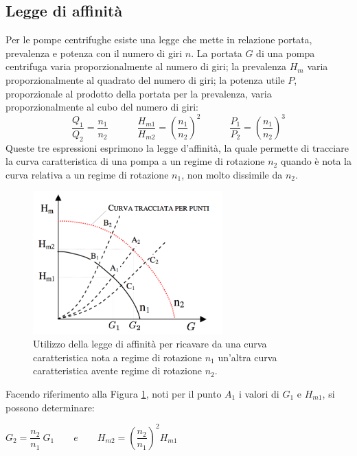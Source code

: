 \documentclass[laurea,oneside,11pt]{USiena_tesiLM}
\begin{document}
\subsection{Legge di affinità}
Per le pompe centrifughe esiste una legge che mette in relazione portata, prevalenza e potenza con il numero di giri $n$.
La portata $G$ di una pompa centrifuga varia proporzionalmente al numero di giri; la prevalenza $H_m$ varia proporzionalmente al quadrato del numero di giri; la potenza utile $P$, proporzionale al prodotto della portata per la prevalenza, varia proporzionalmente al cubo del numero di giri:
\begin{equation}
\frac{Q_1}{Q_2}=\frac{n_1}{n_2} \quad \qquad  \frac{H_{m1}}{H_{m2}}=\left( \frac{n_1}{n_2}\right)^2 \quad \qquad  \frac{P_1}{P_2}=\left( \frac{n_1}{n_2}\right)^3
\label{eq:affinita}
\end{equation}
Queste tre espressioni esprimono la legge d'affinità, la quale permette di tracciare la curva caratteristica di una pompa a un regime di rotazione $n_2$ quando è nota la curva relativa a un regime di rotazione $n_1$, non molto dissimile da $n_2$.

\begin{figure}[!ht]
\centering
\includegraphics[width=0.65\textwidth]{figure/affinita} 
\caption{Utilizzo della legge di affinità per ricavare da una curva caratteristica nota a regime di rotazione $n_1$ un'altra curva caratteristica avente regime di rotazione $n_2$.}
\label{fig:affinita}
\end{figure}

Facendo riferimento alla Figura \ref{fig:affinita}, noti per il punto $A_1$ i valori di $G_1$ e $H_{m1}$, si possono determinare:

\begin{center}
$G_2 = \dfrac{n_2}{n_1} \ G_1 \qquad e \qquad H_{m2} = \left( \dfrac{n_2}{n_1}\right)^2  H_{m1}$
\end{center}
\end{document}
